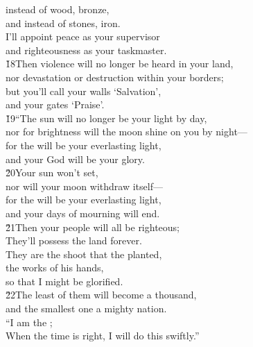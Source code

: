 \begin{poetry}
\poeml instead of wood, bronze, \\
\poemll    and instead of stones, iron. \\
\poeml I'll appoint peace as your supervisor \\
\poemll    and righteousness as your taskmaster. \\
\poeml \v{18}Then violence will no longer be heard in your land, \\
\poemll    nor devastation or destruction within your borders; \\
\poeml but you'll call your walls `Salvation', \\
\poemll    and your gates `Praise'. \\
\poeml \v{19}``The sun will no longer be your light by day, \\
\poemll    nor for brightness will the moon shine on you by night--- \\
\poeml for the  will be your everlasting light, \\
\poemll    and your God will be your glory. \\
\poeml \v{20}Your sun won't set, \\
\poemll    nor will your moon withdraw itself--- \\
\poeml for the  will be your everlasting light, \\
\poemll    and your days of mourning will end. \\
\poeml \v{21}Then your people will all be righteous; \\
\poemll    They'll possess the land forever. \\
\poeml They are the shoot that the  planted, \\
\poemll    the works of his hands, \\
\poemlll       so that I might be glorified. \\
\poeml \v{22}The least of them will become a thousand, \\
\poemll    and the smallest one a mighty nation. \\
\poeml ``I am the ; \\
\poemll    When the time is right, I will do this swiftly.''
\end{poetry}
